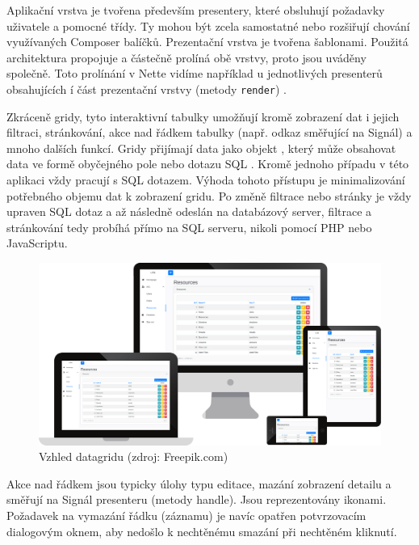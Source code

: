 Aplikační vrstva je tvořena především presentery, které obsluhují požadavky uživatele a pomocné třídy.  Ty mohou být zcela samostatné nebo rozšiřují chování využívaných Composer balíčků. Prezentační vrstva je tvořena šablonami. Použitá architektura propojuje a částečně prolíná obě vrstvy, proto jsou uváděny společně. Toto prolínání v Nette vidíme například u jednotlivých presenterů obsahujících í část prezentační vrstvy (metody \texttt{render}) .




\clearpage
{}

 \label{section:Datagridy}
Zkráceně gridy, tyto interaktivní tabulky umožňují kromě zobrazení dat i jejich filtraci, stránkování, akce nad řádkem tabulky (např. odkaz směřující na Signál) a mnoho dalších funkcí. Gridy přijímají data jako objekt , který může obsahovat data ve formě obyčejného pole nebo dotazu SQL \cite{ContributteDataGrid}. Kromě jednoho případu v této aplikaci vždy pracují s SQL dotazem. Výhoda tohoto přístupu je minimalizování potřebného objemu dat k zobrazení gridu. Po změně filtrace nebo stránky je vždy upraven SQL dotaz a až následně odeslán na databázový server, filtrace a stránkování tedy probíhá přímo na SQL serveru, nikoli pomocí PHP nebo JavaScriptu.

\begin{figure}[h]
	\centering
	\includegraphics[width=\linewidth]{svg/mockup/datagrid.eps}
	\captionsetup{width=\linewidth}
	\caption[Vzhled datagridu]{Vzhled datagridu (zdroj: Freepik.com)}
	\label{mockup:login}
\end{figure}

Akce nad řádkem jsou typicky úlohy typu editace, mazání zobrazení detailu a směřují na Signál presenteru (metody handle). Jsou reprezentovány ikonami. Požadavek na vymazání řádku (záznamu) je navíc opatřen potvrzovacím dialogovým oknem, aby nedošlo k nechtěnému smazání při nechtěném kliknutí.
